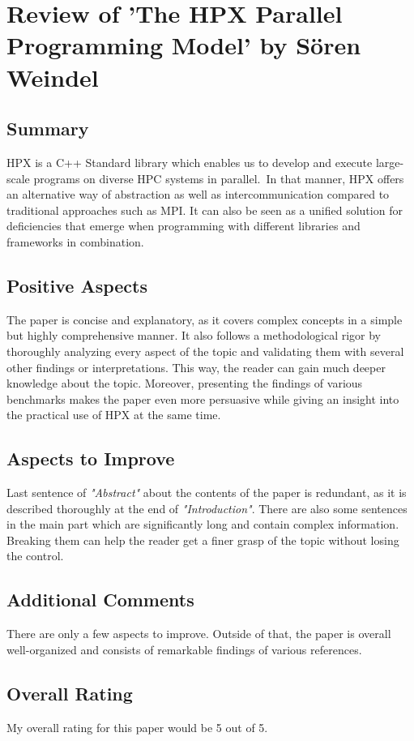 \documentclass[ieeetran]{article}
\begin{document}
\section*{Review of 'The HPX Parallel Programming Model' by Sören Weindel} %
\label{sec:review_of_openMP_an_introduction_by_lukas_limmer}

\subsection*{Summary} %
\label{sub:summary}
HPX is a C++ Standard library which enables us to develop and execute large-scale programs on diverse HPC systems in parallel.\ In that manner, HPX offers an alternative way of abstraction as well as intercommunication compared to traditional approaches such as MPI. It can also be seen as a unified solution for deficiencies that emerge when programming with different libraries and frameworks in combination.

\subsection*{Positive Aspects} %
\label{sub:positive_aspects}
The paper is concise and explanatory, as it covers complex concepts in a simple but highly comprehensive manner. It also follows a methodological rigor by thoroughly analyzing every aspect of the topic and validating them with several other findings or interpretations. This way, the reader can gain much deeper knowledge about the topic. Moreover, presenting the findings of various benchmarks makes the paper even more persuasive while giving an insight into the practical use of HPX at the same time.

\subsection*{Aspects to Improve} %
\label{sub:aspects_to_improve}
Last sentence of \textit{"Abstract"} about the contents of the paper is redundant, as it is described thoroughly at the end of \textit{"Introduction"}. There are also some sentences in the main part which are significantly long and contain complex information. Breaking them can help the reader get a finer grasp of the topic without losing the control.


\subsection*{Additional Comments} %
\label{sub:additional_comments}
There are only a few aspects to improve. Outside of that, the paper is overall well-organized and consists of remarkable findings of various references.


\subsection*{Overall Rating} %
\label{sub:overall_rating}
My overall rating for this paper would be 5 out of 5. 
\end{document}
